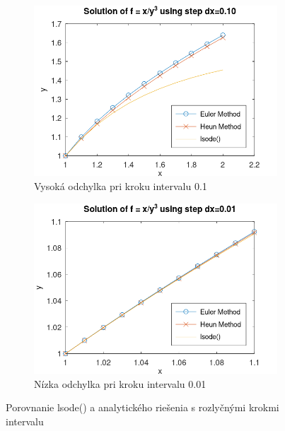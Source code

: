 \documentclass{article}
\theoremstyle{definition}
\theoremstyle{remark}
\begin{document}
\begin{figure}[h]
  \centering
  \begin{subfigure}[b]{0.49\textwidth}
    \includegraphics[width=\textwidth]{lsode01.png}
    \caption{Vysoká odchylka pri kroku intervalu 0.1}
  \end{subfigure}
  \hfill
  \begin{subfigure}[b]{0.49\textwidth}
    \includegraphics[width=\textwidth]{lsode.png}
    \caption{Nízka odchylka pri kroku intervalu 0.01}
  \end{subfigure}
  \caption{Porovnanie lsode() a analytického riešenia s rozlyčnými krokmi intervalu}
\end{figure}
\end{document}
